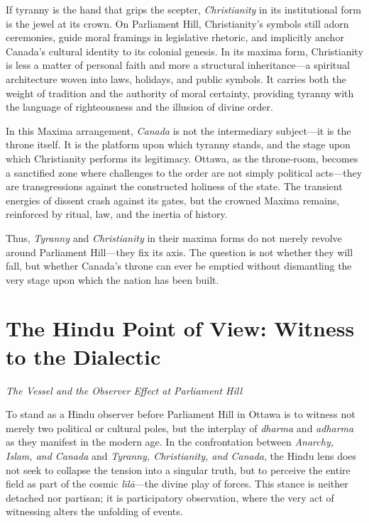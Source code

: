 \documentclass[12pt]{article}
\begin{document}
\begin{multicols}{2}
If tyranny is the hand that grips the scepter, \textit{Christianity} in its institutional form is the jewel at its crown. On Parliament Hill, Christianity’s symbols still adorn ceremonies, guide moral framings in legislative rhetoric, and implicitly anchor Canada’s cultural identity to its colonial genesis. In its maxima form, Christianity is less a matter of personal faith and more a structural inheritance—a spiritual architecture woven into laws, holidays, and public symbols. It carries both the weight of tradition and the authority of moral certainty, providing tyranny with the language of righteousness and the illusion of divine order.

In this Maxima arrangement, \textit{Canada} is not the intermediary subject—it is the throne itself. It is the platform upon which tyranny stands, and the stage upon which Christianity performs its legitimacy. Ottawa, as the throne-room, becomes a sanctified zone where challenges to the order are not simply political acts—they are transgressions against the constructed holiness of the state. The transient energies of dissent crash against its gates, but the crowned Maxima remains, reinforced by ritual, law, and the inertia of history.

Thus, \textit{Tyranny} and \textit{Christianity} in their maxima forms do not merely revolve around Parliament Hill—they fix its axis. The question is not whether they will fall, but whether Canada’s throne can ever be emptied without dismantling the very stage upon which the nation has been built.

\end{multicols}

\newpage
\section*{The Hindu Point of View: Witness to the Dialectic}
\noindent\textit{The Vessel and the Observer Effect at Parliament Hill}

To stand as a Hindu observer before Parliament Hill in Ottawa is to witness not merely two political or cultural poles, but the interplay of \textit{dharma} and \textit{adharma} as they manifest in the modern age. In the confrontation between \textit{Anarchy, Islam, and Canada} and \textit{Tyranny, Christianity, and Canada}, the Hindu lens does not seek to collapse the tension into a singular truth, but to perceive the entire field as part of the cosmic \textit{l\={\i}l\={a}}—the divine play of forces. This stance is neither detached nor partisan; it is participatory observation, where the very act of witnessing alters the unfolding of events.
\end{document}
